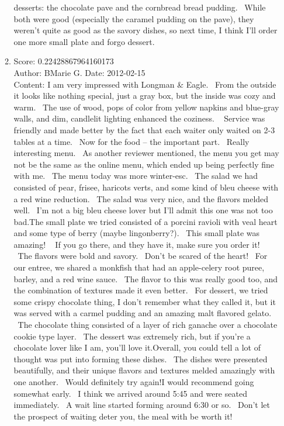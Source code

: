 \documentclass[paper=a4, fontsize=11pt]{jhwhw} %
\begin{document}
\begin{itemize}
\begin{enumerate}
desserts: the chocolate pave and the cornbread bread pudding.  While both were good (especially the caramel pudding on the pave), they weren't quite as good as the savory dishes, so next time, I think I'll order one more small plate and forgo dessert.

            \item Score: 0.22428867964160173\\
                Author: BMarie G.
                Date: 2012-02-15\\
                Content: I am very impressed with Longman \& Eagle.  From the outside it looks like nothing special, just a gray box, but the inside was cozy and warm.  The use of wood, pops of color from yellow napkins and blue-gray walls, and dim, candlelit lighting enhanced the coziness.   Service was friendly and made better by the fact that each waiter only waited on 2-3 tables at a time.  Now for the food -- the important part.  Really interesting menu.  As another reviewer mentioned, the menu you get may not be the same as the online menu, which ended up being perfectly fine with me.  The menu today was more winter-esc.  The salad we had consisted of pear, frisee, haricots verts, and some kind of bleu cheese with a red wine reduction.  The salad was very nice, and the flavors melded well.  I'm not a big bleu cheese lover but I'll admit this one was not too bad.The small plate we tried consisted of a porcini ravioli with veal heart and some type of berry (maybe lingonberry?).  This small plate was amazing!   If you go there, and they have it, make sure you order it!  The flavors were bold and savory.  Don't be scared of the heart!  For our entree, we shared a monkfish that had an apple-celery root puree, barley, and a red wine sauce.  The flavor to this was really good too, and the combination of textures made it even better.  For dessert, we tried some crispy chocolate thing, I don't remember what they called it, but it was served with a carmel pudding and an amazing malt flavored gelato.  The chocolate thing consisted of a layer of rich ganache over a chocolate cookie type layer.  The dessert was extremely rich, but if you're a chocolate lover like I am, you'll love it.Overall, you could tell a lot of thought was put into forming these dishes.  The dishes were presented beautifully, and their unique flavors and textures melded amazingly with one another.  Would definitely try again!I would recommend going somewhat early.  I think we arrived around 5:45 and were seated immediately.  A wait line started forming around 6:30 or so.  Don't let the prospect of waiting deter you, the meal with be worth it!


\end{enumerate}
\end{itemize}
\end{document}
